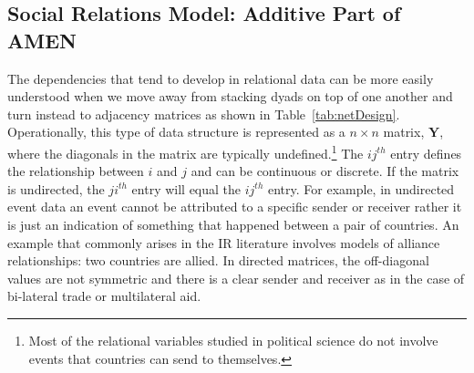 \subsection{Social Relations Model: Additive Part of AMEN}

The dependencies that tend to develop in relational data can be more easily understood when we move away from stacking dyads on top of one another and turn instead to adjacency matrices as shown in Table~\ref{tab:netDesign}. Operationally, this type of data structure is represented as a $n \times n$ matrix, $\mathbf{Y}$, where the diagonals in the matrix are typically undefined.\footnote{Most of the relational variables studied in political science do not involve events that countries can send to themselves.} The $ij^{th}$ entry defines the relationship between $i$ and $j$ and can be continuous or discrete. If the matrix is undirected, the $ji^{th}$ entry will equal the $ij^{th}$ entry. For example, in undirected event data an event cannot be attributed to a specific sender or receiver rather it is just an indication of something that happened between a pair of countries. An example  that commonly arises in the IR literature involves models of alliance relationships: two countries are allied. In directed matrices, the off-diagonal values are not symmetric and there is a clear sender and receiver as in the case of bi-lateral trade or multilateral aid.  

